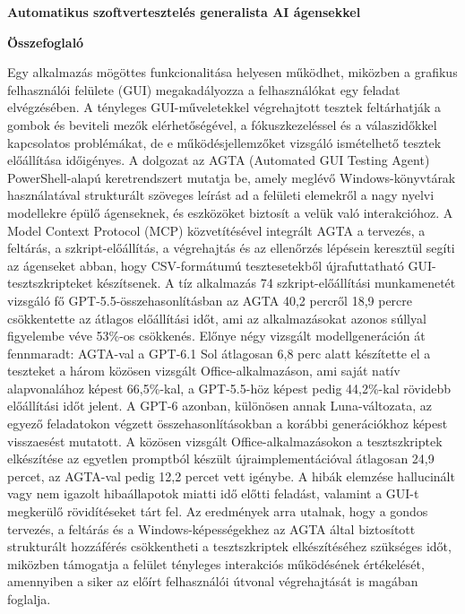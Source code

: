 \documentclass[12pt,a4paper]{article}
\begin{document}
\begin{center}
  {\fontsize{16pt}{20pt}\selectfont\bfseries Automatikus szoftvertesztelés generalista AI ágensekkel\par}
  \vspace{8pt}
  {\fontsize{14pt}{18pt}\selectfont\bfseries Összefoglaló\par}
\end{center}
\vspace{6pt}

Egy alkalmazás mögöttes funkcionalitása helyesen működhet, miközben a grafikus felhasználói felülete (GUI) megakadályozza a felhasználókat egy feladat elvégzésében. A tényleges GUI-műveletekkel végrehajtott tesztek feltárhatják a gombok és beviteli mezők elérhetőségével, a fókuszkezeléssel és a válaszidőkkel kapcsolatos problémákat, de e működésjellemzőket vizsgáló ismételhető tesztek előállítása időigényes. A dolgozat az AGTA (Automated GUI Testing Agent) PowerShell-alapú keretrendszert mutatja be, amely meglévő Windows-könyvtárak használatával strukturált szöveges leírást ad a felületi elemekről a nagy nyelvi modellekre épülő ágenseknek, és eszközöket biztosít a velük való interakcióhoz. A Model Context Protocol (MCP) közvetítésével integrált AGTA a tervezés, a feltárás, a szkript-előállítás, a végrehajtás és az ellenőrzés lépésein keresztül segíti az ágenseket abban, hogy CSV-formátumú tesztesetekből újrafuttatható GUI-tesztszkripteket készítsenek. A tíz alkalmazás 74 szkript-előállítási munkamenetét vizsgáló fő GPT-5.5-összehasonlításban az AGTA 40,2 percről 18,9 percre csökkentette az átlagos előállítási időt, ami az alkalmazásokat azonos súllyal figyelembe véve 53\%-os csökkenés. Előnye négy vizsgált modellgeneráción át fennmaradt: AGTA-val a GPT-6.1 Sol átlagosan 6,8 perc alatt készítette el a teszteket a három közösen vizsgált Office-alkalmazáson, ami saját natív alapvonalához képest 66,5\%-kal, a GPT-5.5-höz képest pedig 44,2\%-kal rövidebb előállítási időt jelent. A GPT-6 azonban, különösen annak Luna-változata, az egyező feladatokon végzett összehasonlításokban a korábbi generációkhoz képest visszaesést mutatott. A közösen vizsgált Office-alkalmazásokon a tesztszkriptek elkészítése az egyetlen promptból készült újraimplementációval átlagosan 24,9 percet, az AGTA-val pedig 12,2 percet vett igénybe. A hibák elemzése hallucinált vagy nem igazolt hibaállapotok miatti idő előtti feladást, valamint a GUI-t megkerülő rövidítéseket tárt fel. Az eredmények arra utalnak, hogy a gondos tervezés, a feltárás és a Windows-képességekhez az AGTA által biztosított strukturált hozzáférés csökkentheti a tesztszkriptek elkészítéséhez szükséges időt, miközben támogatja a felület tényleges interakciós működésének értékelését, amennyiben a siker az előírt felhasználói útvonal végrehajtását is magában foglalja.
\end{document}
